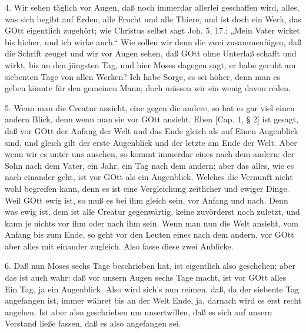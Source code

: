 4. Wir sehen täglich vor Augen, daß noch immerdar allerlei geschaffen wird, alles, was sich begibt auf Erden, alle Frucht und alle Thiere, und ist doch ein Werk, das GOtt eigentlich zugehört; wie Christus selbst sagt Joh. 5, 17.: „Mein Vater wirket bis hieher, und ich wirke
auch.“ Wie sollen wir denn die zwei zusammenfügen, daß die Schrift zeuget und wir vor Augen sehen, daß GOtt ohne Unterlaß schafft und wirkt, bis an den jüngsten Tag, und hier Moses dagegen sagt, er habe geruht am siebenten Tage von allen Werken? Ich habe Sorge, es sei höher, denn man es geben könnte für den gemeinen Mann; doch müssen wir ein wenig davon reden.

5. Wenn man die Creatur ansieht, eine gegen die andere, so hat es gar viel einen andern Blick, denn wenn man sie vor GOtt ansieht. Eben [Cap. 1, § 2] ist gesagt, daß vor GOtt der Anfang der Welt und das Ende gleich als auf Einen Augenblick sind, und gleich gilt der erste Augenblick und der letzte am Ende der Welt. Aber wenn wir es unter uns ansehen, so kommt immerdar eines nach dem andern: der Sohn nach dem Vater, ein Jahr, ein Tag nach dem andern; aber das alles, wie es nach einander geht, ist vor GOtt als ein Augenblick. Welches die Vernunft nicht wohl begreifen kann, denn es ist eine Vergleichung zeitlicher und ewiger Dinge. Weil GOtt ewig ist, so muß es bei ihm gleich sein, vor Anfang und nach. Denn was ewig ist, dem ist alle Creatur gegenwärtig, keine zuvörderst noch zuletzt, und kann je nichts vor ihm oder nach ihm sein. Wenn man nun die Welt ansieht, vom Anfang bis zum Ende, so geht vor den Leuten eines nach dem andern, vor GOtt aber alles mit einander zugleich. Also fasse diese zwei Anblicke.

6. Daß nun Moses sechs Tage beschrieben hat, ist eigentlich also geschehen; aber das ist auch wahr: daß vor unsern Augen sechs Tage macht, ist vor GOtt alles Ein Tag, ja ein Augenblick. Also wird sich’s nun reimen, daß, da der siebente Tag angefangen ist, immer währet bis an der Welt Ende, ja, darnach wird es erst recht angehen. Ist aber also geschrieben um unsertwillen, daß es sich auf unsern Verstand ließe fassen, daß es also angefangen sei.

